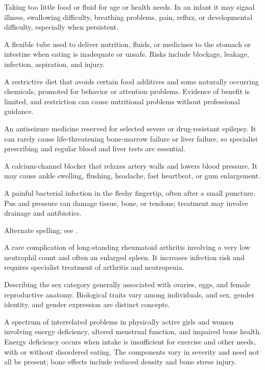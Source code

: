  Taking too little food or fluid for age or health needs. In an infant it may signal illness, swallowing difficulty, breathing problems, pain, reflux, or developmental difficulty, especially when persistent.

 A flexible tube used to deliver nutrition, fluids, or medicines to the stomach or intestine when eating is inadequate or unsafe. Risks include blockage, leakage, infection, aspiration, and injury.

 A restrictive diet that avoids certain food additives and some naturally occurring chemicals, promoted for behavior or attention problems. Evidence of benefit is limited, and restriction can cause nutritional problems without professional guidance.

 An antiseizure medicine reserved for selected severe or drug-resistant epilepsy. It can rarely cause life-threatening bone-marrow failure or liver failure, so specialist prescribing and regular blood and liver tests are essential.

 A calcium-channel blocker that relaxes artery walls and lowers blood pressure. It may cause ankle swelling, flushing, headache, fast heartbeat, or gum enlargement.

 A painful bacterial infection in the fleshy fingertip, often after a small puncture. Pus and pressure can damage tissue, bone, or tendons; treatment may involve drainage and antibiotics.

 Alternate spelling; see .

 A rare complication of long-standing rheumatoid arthritis involving a very low neutrophil count and often an enlarged spleen. It increases infection risk and requires specialist treatment of arthritis and neutropenia.

 Describing the sex category generally associated with ovaries, eggs, and female reproductive anatomy. Biological traits vary among individuals, and sex, gender identity, and gender expression are distinct concepts.

 A spectrum of interrelated problems in physically active
girls and women involving energy deficiency, altered menstrual function, and impaired
bone health. Energy deficiency occurs when intake is insufficient for exercise and other
needs, with or without disordered eating. The components vary in severity and need not all
be present; bone effects include reduced density and bone stress injury.

